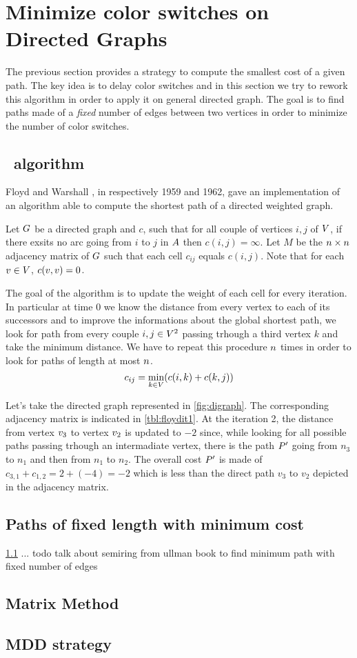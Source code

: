 \section{Minimize color switches on Directed Graphs}

The previous section provides a strategy to compute the smallest cost of a given path. The key idea is to delay color switches and in this section we try to rework this algorithm in order to apply it on general directed graph. The goal is to find paths made of a \textit{fixed} number of edges between two vertices in order to minimize the number of color switches.

\subsection{\FW\ algorithm}
\label{sec:fwalgo}

Floyd \cite[]{floyd} and Warshall \cite{warshall}, in respectively 1959 and 1962, gave an implementation \cite[]{floydalgo} of an algorithm able to compute the shortest path of a directed weighted graph.

Let $G$ be a directed graph and $c$, such that for all couple of vertices $i,j$ of $V$, if there exsits no arc going from $i$ to $j$ in $A$ then  $c(i,j) = \infty$. Let $M$ be the $n \times n$ adjacency matrix of $G$ such that each cell $c_{ij}$ equals $c(i, j)$. Note that for each $v \in V$, $c(v, v) = 0$.

The goal of the algorithm is to update the weight of each cell for every iteration. In particular at time $0$ we know the distance from every vertex to each of its successors and to improve the informations about the global shortest path, we look for path from every couple $i, j \in V^2$ passing trhough a third vertex $k$ and take the minimum distance. We have to repeat this procedure $n$ times in order to look for paths of length at most $n$.
$$c_{ij} = \min_{k \in V} (c(i, k) + c(k, j))$$





Let's take the directed graph represented in \cref{fig:digraph}. The corresponding adjacency matrix is indicated in \cref{tbl:floydit1}. At the iteration 2, the distance from vertex $v_3$ to vertex $v_2$ is updated to $-2$ since, while looking for all possible paths passing trhough an intermadiate vertex, there is the path $P'$ going from $n_3$ to $n_1$ and then from $n_1$ to $n_2$. The overall cost $P'$ is made of $c_{3,1} + c_{1,2} = 2 + (-4) = -2$ which is less than the direct path $v_3$ to $v_2$ depicted in the adjacency matrix.

\subsection{Paths of fixed length with minimum cost}

\cref{sec:fwalgo} ... todo talk about semiring from ullman book to find minimum path with fixed number of edges

\subsection{Matrix Method}

\subsection{MDD strategy}